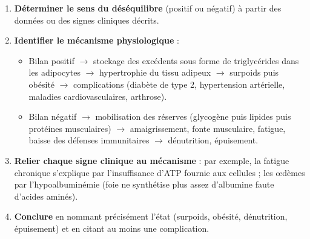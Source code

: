 \documentclass[11pt]{article}
\begin{document}
\begin{methode}
\begin{enumerate}
\item \textbf{Déterminer le sens du déséquilibre} (positif ou négatif) à partir des données ou des signes cliniques décrits.
\item \textbf{Identifier le mécanisme physiologique} :
\begin{itemize}
\item Bilan positif $\rightarrow$ stockage des excédents sous forme de triglycérides dans les adipocytes $\rightarrow$ hypertrophie du tissu adipeux $\rightarrow$ surpoids puis obésité $\rightarrow$ complications (diabète de type 2, hypertension artérielle, maladies cardiovasculaires, arthrose).
\item Bilan négatif $\rightarrow$ mobilisation des réserves (glycogène puis lipides puis protéines musculaires) $\rightarrow$ amaigrissement, fonte musculaire, fatigue, baisse des défenses immunitaires $\rightarrow$ dénutrition, épuisement.
\end{itemize}
\item \textbf{Relier chaque signe clinique au mécanisme} : par exemple, la fatigue chronique s'explique par l'insuffisance d'ATP fournie aux cellules ; les œdèmes par l'hypoalbuminémie (foie ne synthétise plus assez d'albumine faute d'acides aminés).
\item \textbf{Conclure} en nommant précisément l'état (surpoids, obésité, dénutrition, épuisement) et en citant au moins une complication.
\end{enumerate}
\end{methode}
\end{document}
